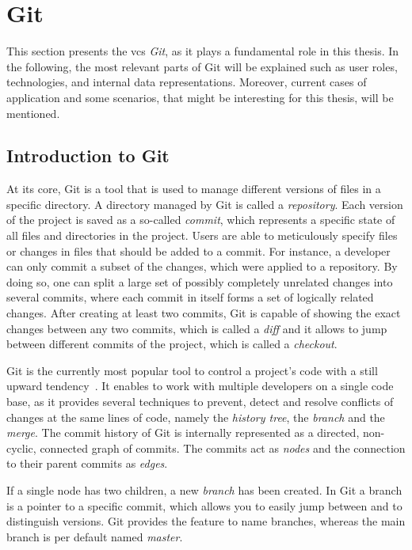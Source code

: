 \section{Git}\label{git-explanation}
This section presents the \ac{vcs} \emph{Git}, as it plays a fundamental role in this thesis.
In the following, the most relevant parts of Git will be explained such as user roles, technologies, and internal data representations.
Moreover, current cases of application and some scenarios, that might be interesting for this thesis, will be mentioned.


\subsection{Introduction to Git}\label{git-introduction}
At its core, Git is a tool that is used to manage different versions of files in a specific directory.
A directory managed by Git is called a \emph{repository}.
Each version of the project is saved as a so-called \emph{commit}, which represents a specific state of all files and directories in the project.
Users are able to meticulously specify files or changes in files that should be added to a commit.
For instance, a developer can only commit a subset of the changes, which were applied to a repository.
By doing so, one can split a large set of possibly completely unrelated changes into several commits, where each commit in itself forms a set of logically related changes.
After creating at least two commits, Git is capable of showing the exact changes between any two commits, which is called a \emph{diff} and it allows to jump between different commits of the project, which is called a \emph{checkout}.

Git is the currently most popular tool to control a project's code with a still upward tendency~\cite{article:git-popularity}.
It enables to work with multiple developers on a single code base, as it provides several techniques to prevent, detect and resolve conflicts of changes at the same lines of code, namely the \emph{history tree}, the \emph{branch} and the \emph{merge}.
The commit history of Git is internally represented as a directed, non-cyclic, connected graph of commits.
The commits act as \emph{nodes} and the connection to their parent commits as \emph{edges}.

If a single node has two children, a new \emph{branch} has been created.
In Git a branch is a pointer to a specific commit, which allows you to easily jump between and to distinguish versions.
Git provides the feature to name branches, whereas the main branch is per default named \emph{master}.

